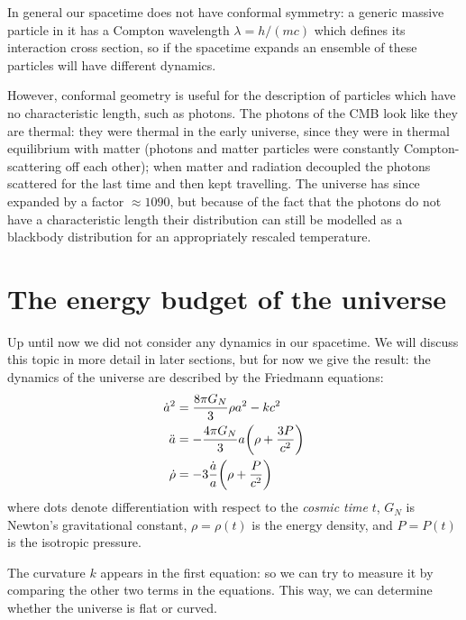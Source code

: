 \documentclass[main.tex]{subfiles}
\begin{document}
In general our spacetime does not have conformal symmetry: a generic massive particle in it has a Compton wavelength \(\lambda = h / (mc)\) which defines its interaction cross section, so if the spacetime expands an ensemble of these particles will have different dynamics.

However, conformal geometry is useful for the description of particles which have no characteristic length, such as photons.
The photons of the CMB look like they are thermal: they were thermal in the early universe, since they were in thermal equilibrium with matter (photons and matter particles were constantly Compton-scattering off each other); when matter and radiation decoupled the photons scattered for the last time and then kept travelling.
The universe has since expanded by a factor \(\approx 1090\), but because of the fact that the photons do not have a characteristic length their distribution can still be modelled as a blackbody distribution for an appropriately rescaled temperature.

\section{The energy budget of the universe}

Up until now we did not consider any dynamics in our spacetime. We will discuss this topic in more detail in later sections, but for now we give the result: the dynamics of the universe are described by the Friedmann equations:
%
\begin{subequations} \label{eq:friedmann-equations} 
\begin{align}
    \dot{a}^2 &= \frac{8 \pi G_N }{3} \rho a^2 - kc^2  \label{eq:friedmann-1}\\
    \ddot{a} &= - \frac{4 \pi G_N }{3} a  \qty(\rho  + \frac{3P}{c^2} )  \label{eq:friedmann-2}\\
    \dot{\rho} &= -3 \frac{\dot{a} }{a} \qty(\rho + \frac{P}{c^2} ) \label{eq:friedmann-3}
\end{align}
\end{subequations}
%
where dots denote differentiation with respect to the \emph{cosmic time} \(t\), \(G_N\) is Newton's gravitational constant, \(\rho = \rho( t) \) is the energy density, and \(P = P(t)\) is  the isotropic pressure.

The curvature \(k\) appears in the first equation: so we can try to measure it by comparing the other two terms in the equations.
This way, we can determine whether the universe is flat or curved.
\end{document}
